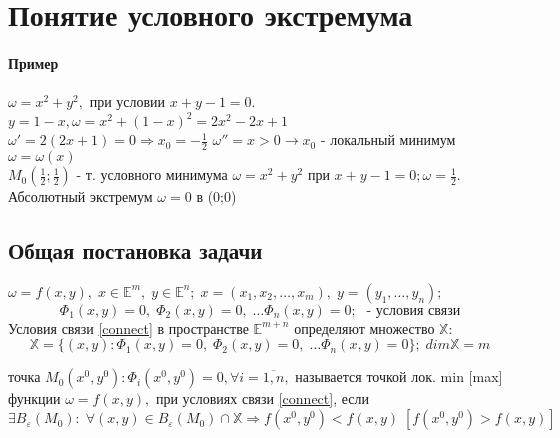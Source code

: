 

\section{Понятие условного экстремума}
\paragraph{Пример}
$\omega=x^2+y^2,	$ при условии $x+y-1=0.$\\
$y=1-x, \omega = x^2+(1-x)^2=2x^2-2x+1$\\
$\omega'=2(2x+1)=0 \Rightarrow x_0=-\frac 1 2$
$\omega''=x>0 \rightarrow x_0$ - локальный минимум $\omega=\omega(x)$\\
$M_0(\frac 1 2; \frac 1 2)$ - т. условного минимума $\omega=x^2+y^2$ при $x+y-1=0; \omega=\frac 1 2$. Абсолютный экстремум $\omega=0$ в (0;0)
\subsection{Общая постановка задачи}
$\omega=f(x,y), \; x\in\mathbb{E}^m, \; y\in\mathbb{E}^n; \; x=(x_1,x_2,\dots, x_m), \; y=(y_1,\dots, y_n);$
\begin{equation}\label{connect}
	\Phi_1(x,y)=0, \; \Phi_2(x,y)=0, \; \dots \Phi_n(x,y)=0;\; \text{  - условия связи}
\end{equation}
Условия связи \ref{connect} в пространстве $\mathbb{E}^{m+n}$ определяют множество $\mathbb{X}:$ $$\mathbb{X}=\{(x,y): \Phi_1(x,y)=0, \; \Phi_2(x,y)=0, \; \dots \Phi_n(x,y)=0 \};\; dim \mathbb{X} = m$$
\begin{determenition}
	точка $M_0(x^0, y^0): \Phi_i(x^0, y^0)=0, \forall i=\overline{1,n},$ называется точкой лок. min [max] функции $\omega=f(x,y),$ при условиях связи \ref{connect}, если 
	$$\exists B_\varepsilon (M_0):\; \forall (x,y)\in B_\varepsilon (M_0) \cap \mathbb{X} \Rightarrow f(x^0, y^0)<f(x,y) \; [f(x^0, y^0)>f(x,y)]$$
\end{determenition}
